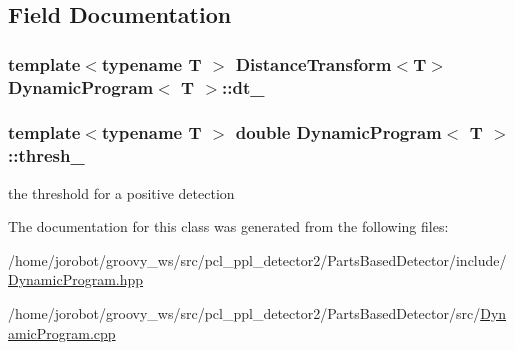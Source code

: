 \subsection{\-Field \-Documentation}
\hypertarget{classDynamicProgram_a6cea0b8559d6a03d81e2003991ab67cf}{
\subsubsection[{dt\-\_\-}]{\setlength{\rightskip}{0pt plus 5cm}template$<$typename T $>$ {\bf \-Distance\-Transform}$<$\-T$>$ {\bf \-Dynamic\-Program}$<$ \-T $>$\-::{\bf dt\-\_\-}}}\label{classDynamicProgram_a6cea0b8559d6a03d81e2003991ab67cf}
\hypertarget{classDynamicProgram_a08f2d4801faa0f964e217b9ac9927ec6}{
\subsubsection[{thresh\-\_\-}]{\setlength{\rightskip}{0pt plus 5cm}template$<$typename T $>$ double {\bf \-Dynamic\-Program}$<$ \-T $>$\-::{\bf thresh\-\_\-}}}\label{classDynamicProgram_a08f2d4801faa0f964e217b9ac9927ec6}


the threshold for a positive detection 



\-The documentation for this class was generated from the following files\-:\begin{DoxyCompactItemize}
\item 
/home/jorobot/groovy\-\_\-ws/src/pcl\-\_\-ppl\-\_\-detector2/\-Parts\-Based\-Detector/include/\hyperlink{DynamicProgram_8hpp}{\-Dynamic\-Program.\-hpp}\item 
/home/jorobot/groovy\-\_\-ws/src/pcl\-\_\-ppl\-\_\-detector2/\-Parts\-Based\-Detector/src/\hyperlink{DynamicProgram_8cpp}{\-Dynamic\-Program.\-cpp}\end{DoxyCompactItemize}
